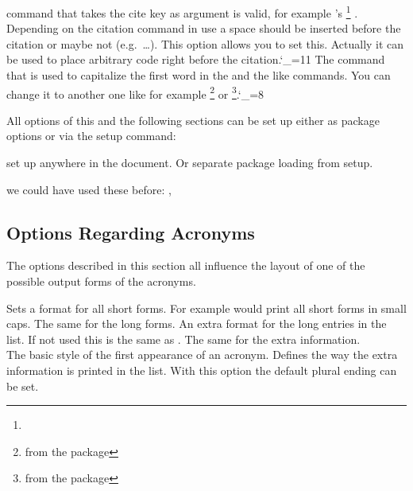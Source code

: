 \documentclass[DIV10,toc=index,toc=bib,hyperfootnotes=false]{cnpkgdoc}
\begin{document}
\begin{beschreibung}
   command that takes the cite key as argument is valid, for example 's%
   \footnote{} .
   Depending on the citation command in use a space should be inserted before the
   citation or maybe not (e.g.\ \ldots). This option allows you to
   set this. Actually it can be used to place arbitrary code right before the
   citation.\catcode`\_=11
   The command that is used to capitalize the first word in the  and the
   like commands. You can change it to another one like for example
   \footnote{from the  package} or
   \footnote{from the  package}.\catcode`\_=8
\end{beschreibung}

All options of this and the following sections can be set up either as package
options or via the setup command:
\begin{beschreibung}
  set up \acro anywhere in the document. Or separate
 package loading from setup.
\end{beschreibung}

\begin{beispiel}
 we could have used these before: \nato, \ny
\end{beispiel}

\subsection{Options Regarding Acronyms}
The options described in this section all influence the layout of one of the
possible output forms of the acronyms.
\begin{beschreibung}
 \Default
   Sets a format for all short forms. For example 
   would print all short forms in small caps.
 \Default
   The same for the long forms.
 \Default
   An extra format for the long entries in the list. If not used this is the same
   as .
 \Default
   The same for the extra information.
 \\
 \null{}
   The basic style of the first appearance of an acronym.
   Defines the way the extra information is printed in the list.
   With this option the default plural ending can be set.
\end{beschreibung}
\end{document}
